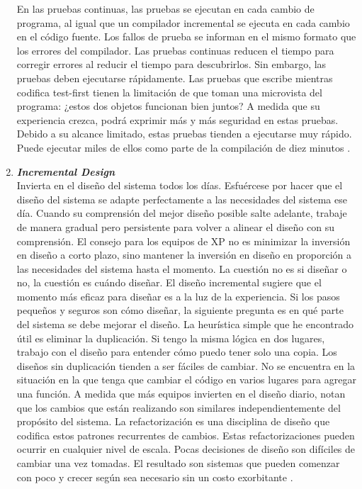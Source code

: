 \begin{spacing}{1.5}
\begin{enumerate}
				En las pruebas continuas, las pruebas se ejecutan en cada cambio de programa, al igual que un compilador incremental se ejecuta en cada cambio en el código fuente. Los fallos de prueba se informan en el mismo formato que los errores del compilador. Las pruebas continuas reducen el tiempo para corregir errores al reducir el tiempo para descubrirlos. Sin embargo, las pruebas deben ejecutarse rápidamente.				
				Las pruebas que escribe mientras codifica test-first tienen la limitación de que toman una microvista del programa: ¿estos dos objetos funcionan bien juntos? A medida que su experiencia crezca, podrá exprimir más y más seguridad en estas pruebas. Debido a su alcance limitado, estas pruebas tienden a ejecutarse muy rápido. Puede ejecutar miles de ellos como parte de la compilación de diez minutos \cite{chap2_extreme_programming}.
				\item \textit{\textbf{Incremental Design}}\\
				Invierta en el diseño del sistema todos los días. Esfuércese por hacer que el diseño del sistema se adapte perfectamente a las necesidades del sistema ese día. Cuando su comprensión del mejor diseño posible salte adelante, trabaje de manera gradual pero persistente para volver a alinear el diseño con su comprensión.
				El consejo para los equipos de XP no es minimizar la inversión en diseño a corto plazo, sino mantener la inversión en diseño en proporción a las necesidades del sistema hasta el momento. La cuestión no es si diseñar o no, la cuestión es cuándo diseñar. El diseño incremental sugiere que el momento más eficaz para diseñar es a la luz de la experiencia.
				Si los pasos pequeños y seguros son cómo diseñar, la siguiente pregunta es en qué parte del sistema se debe mejorar el diseño. La heurística simple que he encontrado útil es eliminar la duplicación. Si tengo la misma lógica en dos lugares, trabajo con el diseño para entender cómo puedo tener solo una copia. Los diseños sin duplicación tienden a ser fáciles de cambiar. No se encuentra en la situación en la que tenga que cambiar el código en varios lugares para agregar una función.
				A medida que más equipos invierten en el diseño diario, notan que los cambios que están realizando son similares independientemente del propósito del sistema. La refactorización es una disciplina de diseño que codifica estos patrones recurrentes de cambios. Estas refactorizaciones pueden ocurrir en cualquier nivel de escala. Pocas decisiones de diseño son difíciles de cambiar una vez tomadas. El resultado son sistemas que pueden comenzar con poco y crecer según sea necesario sin un costo exorbitante \cite{chap2_extreme_programming}.
			\end{enumerate}

\end{spacing}
